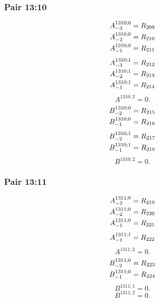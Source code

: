 \documentclass[11pt,a4paper]{article}
\begin{document}
\subsubsection{Pair 13:10}
\begin{equation}
\shortstack[l]{$\displaystyle A^{1310;0}_{-3}=R_{209}$\\
$\displaystyle A^{1310;0}_{-2}=R_{210}$\\
$\displaystyle A^{1310;0}_{-1}=R_{211}$}
\label{eq:cat-map-342}
\end{equation}
\begin{equation}
\shortstack[l]{$\displaystyle A^{1310;1}_{-3}=R_{212}$\\
$\displaystyle A^{1310;1}_{-2}=R_{213}$\\
$\displaystyle A^{1310;1}_{-1}=R_{214}$}
\label{eq:cat-map-343}
\end{equation}
\begin{equation}
A^{1310;2}=0.
\label{eq:cat-map-344}
\end{equation}
\begin{equation}
\shortstack[l]{$\displaystyle B^{1310;0}_{-2}=R_{215}$\\
$\displaystyle B^{1310;0}_{-1}=R_{216}$}
\label{eq:cat-map-345}
\end{equation}
\begin{equation}
\shortstack[l]{$\displaystyle B^{1310;1}_{-2}=R_{217}$\\
$\displaystyle B^{1310;1}_{-1}=R_{218}$}
\label{eq:cat-map-346}
\end{equation}
\begin{equation}
B^{1310;2}=0.
\label{eq:cat-map-347}
\end{equation}
\subsubsection{Pair 13:11}
\begin{equation}
\shortstack[l]{$\displaystyle A^{1311;0}_{-3}=R_{219}$\\
$\displaystyle A^{1311;0}_{-2}=R_{220}$\\
$\displaystyle A^{1311;0}_{-1}=R_{221}$}
\label{eq:cat-map-348}
\end{equation}
\begin{equation}
\shortstack[l]{$\displaystyle A^{1311;1}_{-1}=R_{222}$}
\label{eq:cat-map-349}
\end{equation}
\begin{equation}
A^{1311;2}=0.
\label{eq:cat-map-350}
\end{equation}
\begin{equation}
\shortstack[l]{$\displaystyle B^{1311;0}_{-2}=R_{223}$\\
$\displaystyle B^{1311;0}_{-1}=R_{224}$}
\label{eq:cat-map-351}
\end{equation}
\begin{equation}
B^{1311;1}=0.
\label{eq:cat-map-352}
\end{equation}
\begin{equation}
B^{1311;2}=0.
\label{eq:cat-map-353}
\end{equation}
\end{document}
